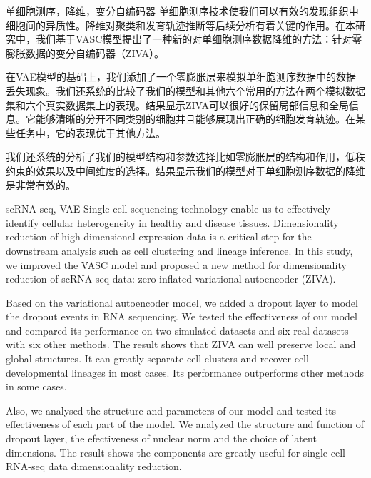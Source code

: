 \begin{中文摘要}{单细胞测序，降维，变分自编码器}
  单细胞测序技术使我们可以有效的发现组织中细胞间的异质性。降维对聚类和发育轨迹推断等后续分析有着关键的作用。在本研究中，我们基于VASC模型提出了一种新的对单细胞测序数据降维的方法：针对零膨胀数据的变分自编码器（ZIVA）。
  
  在VAE模型的基础上，我们添加了一个零膨胀层来模拟单细胞测序数据中的数据丢失现象。我们还系统的比较了我们的模型和其他六个常用的方法在两个模拟数据集和六个真实数据集上的表现。结果显示ZIVA可以很好的保留局部信息和全局信息。它能够清晰的分开不同类别的细胞并且能够展现出正确的细胞发育轨迹。在某些任务中，它的表现优于其他方法。
  
  我们还系统的分析了我们的模型结构和参数选择比如零膨胀层的结构和作用，低秩约束的效果以及中间维度的选择。结果显示我们的模型对于单细胞测序数据的降维是非常有效的。
\end{中文摘要}

\begin{英文摘要}{scRNA-seq, VAE}
  Single cell sequencing technology enable us to effectively identify cellular heterogeneity in healthy and disease tissues. Dimensionality reduction of high dimensional expression data is a critical step for the downstream analysis such as cell clustering and lineage inference. In this study, we improved the VASC model and proposed a new method for dimensionality reduction of scRNA-seq data: zero-inflated variational autoencoder (ZIVA).
  
  Based on the variational autoencoder model, we added a dropout layer to model the dropout events in RNA sequencing. We tested the effectiveness of our model and compared its performance on two simulated datasets and six real datasets with six other methods. The result shows that ZIVA can well preserve local and global structures. It can greatly separate cell clusters and recover cell developmental lineages in most cases. Its performance outperforms other methods in some cases. 
  
  Also, we analysed the structure and parameters of our model and tested its effectiveness of each part of the model. We analyzed the structure and function of dropout layer, the efectiveness of nuclear norm and the choice of latent dimensions. The result shows the components are greatly useful for single cell RNA-seq data dimensionality reduction.
\end{英文摘要}
